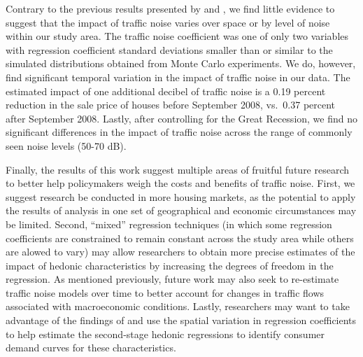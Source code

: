 \documentclass{article}\usepackage{graphicx, color}
\begin{document}
Contrary to the previous results presented by \citet{MarmolejoDuarteCarlos;GonzalezTamez2009} and \citet{Theebe2004a}, we find little evidence to suggest that the impact of traffic noise varies over space or by level of noise within our study area. The traffic noise coefficient was one of only two variables with regression coefficient standard deviations smaller than or similar to the simulated distributions obtained from Monte Carlo experiments. We do, however, find significant temporal variation in the impact of traffic noise in our data. The estimated impact of one additional decibel of traffic noise is a 0.19 percent reduction in the sale price of houses before September 2008, vs.\ 0.37 percent after September 2008. Lastly, after controlling for the Great Recession, we find no significant differences in the impact of traffic noise across the range of commonly seen noise levels (50-70 dB).

Finally, the results of this work suggest multiple areas of fruitful future research to better help policymakers weigh the costs and benefits of traffic noise. First, we suggest research be conducted in more housing markets, as the potential to apply the results of analysis in one set of geographical and economic circumstances may be limited. Second, ``mixed'' regression techniques (in which some regression coefficients are constrained to remain constant across the study area while others are alowed to vary) may allow researchers to obtain more precise estimates of the impact of hedonic characteristics by increasing the degrees of freedom in the regression. As mentioned previously, future work may also seek to re-estimate traffic noise models over time to better account for changes in traffic flows associated with macroeconomic conditions. Lastly, researchers may want to take advantage of the findings of \citet{Carruthers2010} and use the spatial variation in regression coefficients to help estimate the second-stage hedonic regressions to identify consumer demand curves for these characteristics.

\begin{singlespace}


\end{singlespace}
\end{document}
